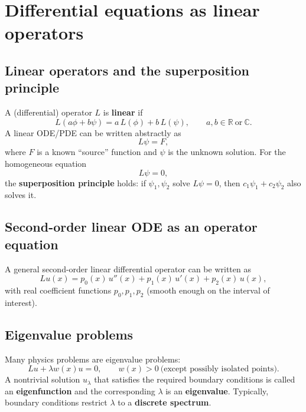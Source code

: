 
\section{Differential equations as linear operators}

\subsection{Linear operators and the superposition principle}
A (differential) operator $L$ is \textbf{linear} if
\begin{equation}
L(a\phi + b\psi) = a\,L(\phi) + b\,L(\psi),
\qquad a,b \in \mathbb{R}\ \text{or}\ \mathbb{C}.
\end{equation}
A linear ODE/PDE can be written abstractly as
\begin{equation}
L\psi = F,
\end{equation}
where $F$ is a known ``source'' function and $\psi$ is the unknown solution.
For the homogeneous equation
\begin{equation}
L\psi = 0,
\end{equation}
the \textbf{superposition principle} holds:
if $\psi_1,\psi_2$ solve $L\psi=0$, then $c_1\psi_1+c_2\psi_2$ also solves it.

\subsection{Second-order linear ODE as an operator equation}
A general second-order linear differential operator can be written as
\begin{equation}
Lu(x) = p_0(x)\,u''(x) + p_1(x)\,u'(x) + p_2(x)\,u(x),
\end{equation}
with real coefficient functions $p_0,p_1,p_2$ (smooth enough on the interval of interest).

\subsection{Eigenvalue problems}
Many physics problems are eigenvalue problems:
\begin{equation}
Lu + \lambda w(x)u = 0,
\qquad w(x)>0\ \text{(except possibly isolated points)}.
\end{equation}
A nontrivial solution $u_\lambda$ that satisfies the required boundary conditions is called an
\textbf{eigenfunction} and the corresponding $\lambda$ is an \textbf{eigenvalue}.
Typically, boundary conditions restrict $\lambda$ to a \textbf{discrete spectrum}.

